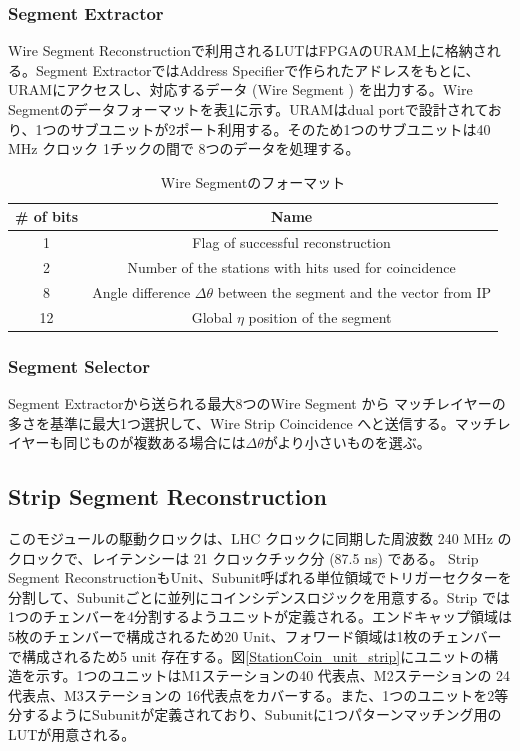 \subsubsection*{Segment Extractor}
Wire Segment Reconstructionで利用されるLUTはFPGAのURAM上に格納される。Segment ExtractorではAddress Specifierで作られたアドレスをもとに、URAMにアクセスし、対応するデータ (Wire Segment ) を出力する。Wire Segmentのデータフォーマットを表\ref{tab:WireSegment}に示す。URAMはdual portで設計されており、1つのサブユニットが2ポート利用する。そのため1つのサブユニットは40 MHz クロック 1チックの間で 8つのデータを処理する。

\begin{table}[h]
    \centering
    \caption{Wire Segmentのフォーマット}
    \label{tab:WireSegment}
    \begin{tabular}{|c|c|}
    \hline
    \# of bits & Name                                                                       \\ \hline\hline
    1          & Flag of successful reconstruction                                          \\ \hline
    2          & Number of the stations with hits used for coincidence                      \\ \hline
    8          & Angle difference $\Delta\theta$ between the segment and the vector from IP \\ \hline
    12         & Global $\eta$ position of the segment                                      \\ \hline
    \end{tabular}
\end{table}

\subsubsection*{Segment Selector}
Segment Extractorから送られる最大8つのWire Segment から マッチレイヤーの多さを基準に最大1つ選択して、Wire Strip Coincidence へと送信する。マッチレイヤーも同じものが複数ある場合には$\Delta\theta$がより小さいものを選ぶ。

\subsection*{Strip Segment Reconstruction}
このモジュールの駆動クロックは、LHC クロックに同期した周波数 240 MHz のクロックで、レイテンシーは 21 クロックチック分 (87.5 ns) である。
Strip Segment ReconstructionもUnit、Subunit呼ばれる単位領域でトリガーセクターを分割して、Subunitごとに並列にコインシデンスロジックを用意する。Strip では 1つのチェンバーを4分割するようユニットが定義される。エンドキャップ領域は5枚のチェンバーで構成されるため20 Unit、フォワード領域は1枚のチェンバーで構成されるため5 unit 存在する。図\ref{StationCoin_unit_strip}にユニットの構造を示す。1つのユニットはM1ステーションの40 代表点、M2ステーションの 24代表点、M3ステーションの 16代表点をカバーする。また、1つのユニットを2等分するようにSubunitが定義されており、Subunitに1つパターンマッチング用のLUTが用意される。

